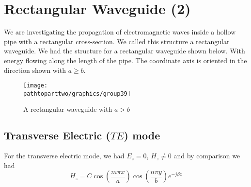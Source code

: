 \chapter{Rectangular Waveguide (2)}

We are investigating the propagation of electromagnetic waves inside a hollow pipe with a rectangular cross-section. We called this structure a rectangular waveguide. We had the structure for a rectangular waveguide shown below. With energy flowing along the length of the pipe. The coordinate axis is oriented in the direction shown with $a\geq b$.
\begin{figure}[h]
\centering
\texttt{[image: \\pathtoparttwo/graphics/group39]}
\caption{A rectangular waveguide with $a>b$}
\end{figure}

\section{Transverse Electric  ($TE$) mode}
For the transverse electric mode, we had $E_z = 0$, $H_z \neq 0$ and by comparison we had 
\begin{dmath}
H_z = C\cos(\frac{m\pi x}{a}) \cos(\frac{n\pi y}{b})e^{-j\beta z}
\label{eqn:magneticfield}
\end{dmath}

